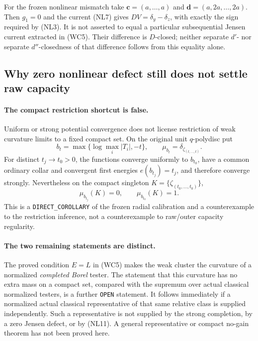 \documentclass[11pt,a4paper]{article}
\numberwithin{equation}{section}
\theoremstyle{definition}
\theoremstyle{remark}
\begin{document}
For the frozen nonlinear mismatch take
$\mathbf c=(a,\ldots,a)$ and
$\mathbf d=(a,2a,\ldots,2a)$.  Then $g_1=0$ and the current
(NL7) gives $DV=\delta_y-\delta_z$, with exactly the sign
required by (NL3).  It is not asserted to equal a particular
subsequential Jensen current extracted in (WC5).  Their difference
is $D$-closed; neither separate $d'$- nor separate $d''$-closedness
of that difference follows from this equality alone.

\subsection{Why zero nonlinear defect still does not settle raw capacity}

\paragraph{The compact restriction shortcut is false.}
Uniform or strong potential convergence does not license restriction
of weak curvature limits to a fixed compact set.  On the original
unit $q$-polydisc put
\[
 b_t=\max\{\log\max_i|T_i|,-t\},\qquad
                  \mu_{b_t}=\delta_{\zeta_{(t,\ldots,t)}}.
 \tag{NL10}
\]
For distinct $t_j\to t_0>0$, the functions converge uniformly
to $b_{t_0}$, have a common ordinary collar and convergent first
energies $e(b_{t_j})=t_j$, and therefore converge strongly.
Nevertheless on the compact singleton
$K=\{\zeta_{(t_0,\ldots,t_0)}\}$,
\[
                    \mu_{b_{t_j}}(K)=0,
                  \qquad\mu_{b_{t_0}}(K)=1.
 \tag{NL11}
\]
This is a \texttt{DIRECT\_COROLLARY} of the frozen radial
calibration and a counterexample to the restriction inference,
not a counterexample to raw/outer capacity regularity.

\paragraph{The two remaining statements are distinct.}
The proved condition $E=L$ in (WC5) makes the weak cluster the
curvature of a normalized \emph{completed Borel} tester.  The
statement that this curvature has no extra mass on a compact set,
compared with the supremum over actual classical normalized
testers, is a further \texttt{OPEN} statement.  It follows
immediately if a normalized actual classical representative of
that same relative class is supplied independently.  Such a
representative is not supplied by the strong completion, by a
zero Jensen defect, or by (NL11).  A general representative or
compact no-gain theorem has not been proved here.
\end{document}
